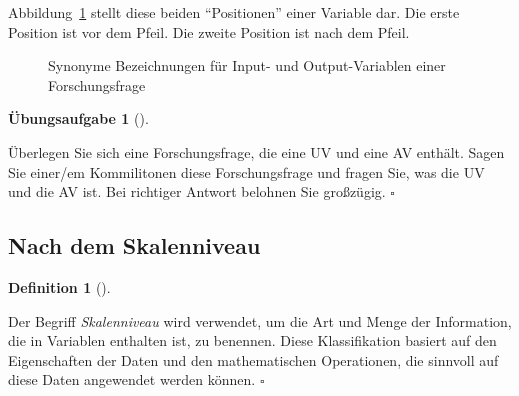 \documentclass[
  a4paper,
  DIV=11]{scrreprt}
\theoremstyle{definition}
\newtheorem{exercise}{Übungsaufgabe}[chapter]
\theoremstyle{definition}
\theoremstyle{definition}
\newtheorem{definition}{Definition}[chapter]
\theoremstyle{remark}
\begin{document}
Abbildung~\ref{fig-ueberblick-fragen} stellt diese beiden ``Positionen''
einer Variable dar. Die erste Position ist vor dem Pfeil. Die zweite
Position ist nach dem Pfeil.

\begin{figure}


\caption{\label{fig-ueberblick-fragen}Synonyme Bezeichnungen für Input-
und Output-Variablen einer Forschungsfrage}

\end{figure}%

\begin{exercise}[]\protect\hypertarget{exr-uvav}{}\label{exr-uvav}

Überlegen Sie sich eine Forschungsfrage, die eine UV und eine AV
enthält. Sagen Sie einer/em Kommilitonen diese Forschungsfrage und
fragen Sie, was die UV und die AV ist. Bei richtiger Antwort belohnen
Sie großzügig. \(\square\)

\end{exercise}

\subsection{Nach dem Skalenniveau}\label{nach-dem-skalenniveau}

\begin{definition}[]\protect\hypertarget{def-skalenniveau}{}\label{def-skalenniveau}

Der Begriff \emph{Skalenniveau} wird verwendet, um die Art und Menge der
Information, die in Variablen enthalten ist, zu benennen. Diese
Klassifikation basiert auf den Eigenschaften der Daten und den
mathematischen Operationen, die sinnvoll auf diese Daten angewendet
werden können. \(\square\)

\end{definition}
\end{document}
